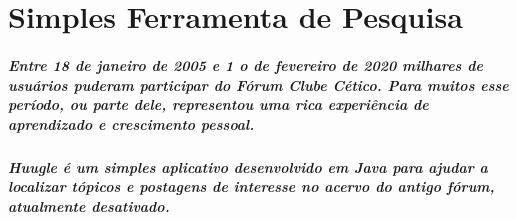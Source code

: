 \documentclass[a4paper,12pt,openany]{book}
\begin{document}
\chapter*{Simples Ferramenta de Pesquisa}


\paragraph{Entre 18 de janeiro de 2005 e 1 o de fevereiro de 2020 milhares de usuários puderam participar do Fórum
Clube Cético. Para muitos esse período, ou parte dele, representou uma rica experiência de aprendizado
e crescimento pessoal.}
\paragraph{Huugle é um simples aplicativo desenvolvido em Java para ajudar a localizar tópicos e postagens de
interesse no acervo do antigo fórum, atualmente desativado.}




\newpage

 
\end{document}

